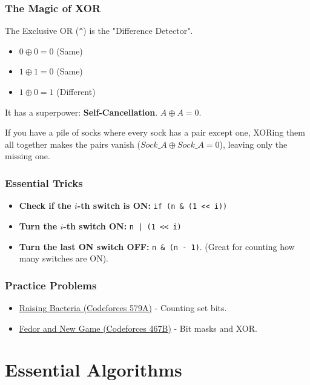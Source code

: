 \documentclass[12pt, a4paper]{report}
\begin{document}
\section{The Magic of XOR}
The Exclusive OR (\texttt{\^}) is the "Difference Detector".
\begin{itemize}
    \item $0 \oplus 0 = 0$ (Same)
    \item $1 \oplus 1 = 0$ (Same)
    \item $1 \oplus 0 = 1$ (Different)
\end{itemize}
It has a superpower: \textbf{Self-Cancellation}. $A \oplus A = 0$.
\begin{hintbox}
If you have a pile of socks where every sock has a pair except one, XORing them all together makes the pairs vanish ($Sock\_A \oplus Sock\_A = 0$), leaving only the missing one.
\end{hintbox}

\section{Essential Tricks}
\begin{itemize}
    \item \textbf{Check if the $i$-th switch is ON:} \texttt{if (n \& (1 << i))}
    \item \textbf{Turn the $i$-th switch ON:} \texttt{n | (1 << i)}
    \item \textbf{Turn the last ON switch OFF:} \texttt{n \& (n - 1)}. (Great for counting how many switches are ON).
\end{itemize}

\section{Practice Problems}
\begin{itemize}
    \item \href{https://codeforces.com/problemset/problem/579/A}{Raising Bacteria (Codeforces 579A)} - Counting set bits.
    \item \href{https://codeforces.com/problemset/problem/467/B}{Fedor and New Game (Codeforces 467B)} - Bit masks and XOR.
\end{itemize}

\part{Essential Algorithms}
\end{document}
